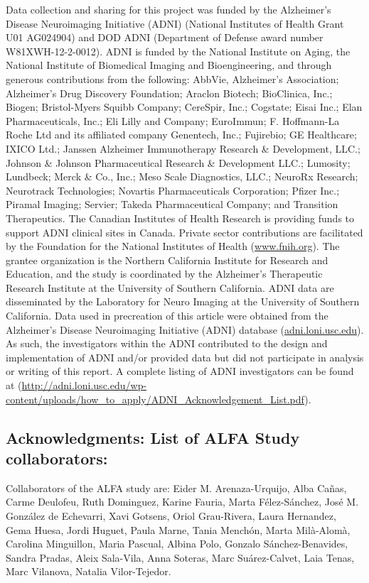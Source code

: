 Data collection and sharing for this project was funded by the Alzheimer's Disease Neuroimaging Initiative (ADNI) (National Institutes of Health Grant U01 AG024904) and DOD ADNI (Department of Defense award number W81XWH-12-2-0012). ADNI is funded by the National Institute on Aging, the National Institute of Biomedical Imaging and Bioengineering, and through generous contributions from the following: AbbVie, Alzheimer’s Association; Alzheimer’s Drug Discovery Foundation; Araclon Biotech; BioClinica, Inc.; Biogen; Bristol-Myers Squibb Company; CereSpir, Inc.; Cogstate; Eisai Inc.; Elan Pharmaceuticals, Inc.; Eli Lilly and Company; EuroImmun; F. Hoffmann-La Roche Ltd and its affiliated company Genentech, Inc.; Fujirebio; GE Healthcare; IXICO Ltd.; Janssen Alzheimer Immunotherapy Research {\&} Development, LLC.; Johnson {\&} Johnson Pharmaceutical Research {\&} Development LLC.; Lumosity; Lundbeck; Merck {\&} Co., Inc.; Meso Scale Diagnostics, LLC.; NeuroRx Research; Neurotrack Technologies; Novartis Pharmaceuticals Corporation; Pfizer Inc.; Piramal Imaging; Servier; Takeda Pharmaceutical Company; and Transition Therapeutics. The Canadian Institutes of Health Research is providing funds to support ADNI clinical sites in Canada. Private sector contributions are facilitated by the Foundation for the National Institutes of Health (\url{www.fnih.org}). The grantee organization is the Northern California Institute for Research and Education, and the study is coordinated by the Alzheimer’s Therapeutic Research Institute at the University of Southern California. ADNI data are disseminated by the Laboratory for Neuro Imaging at the University of Southern California. Data used in precreation of this article were obtained from the Alzheimer’s Disease Neuroimaging Initiative (ADNI) database (\url{adni.loni.usc.edu}). As such, the investigators within the ADNI contributed to the design and implementation of ADNI and/or provided data but did not participate in analysis or writing of this report. A complete listing of ADNI investigators can be found at (\url{http://adni.loni.usc.edu/wp-content/uploads/how_to_apply/ADNI_Acknowledgement_List.pdf}).

\subsection*{Acknowledgments: List of ALFA Study collaborators:}
Collaborators of the ALFA study are: Eider M. Arenaza-Urquijo, Alba Cañas, Carme Deulofeu, Ruth Dominguez, Karine Fauria, Marta Félez-Sánchez, José M. González de Echevarri, Xavi Gotsens, Oriol Grau-Rivera, Laura Hernandez, Gema Huesa, Jordi Huguet, Paula Marne, Tania Menchón, Marta Milà-Alomà, Carolina Minguillon, Maria Pascual, Albina Polo, Gonzalo Sánchez-Benavides, Sandra Pradas, Aleix Sala-Vila, Anna Soteras, Marc Suárez-Calvet, Laia Tenas, Marc Vilanova, Natalia Vilor-Tejedor.

